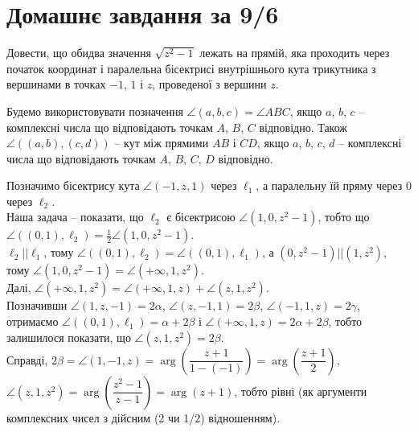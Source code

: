 \section{Домашнє завдання за 9/6}

\begin{problem}[Волковиський, 1.5]
    Довести, що обидва значення $\sqrt{z^2-1}$ лежать на прямій, яка проходить через початок координат і паралельна бісектрисі внутрішнього кута трикутника з вершинами в точках $-1$, $1$ і $z$, проведеної з вершини $z$.
\end{problem}

\begin{solution}
    Будемо використовувати позначення $\angle(a,b,c)=\angle ABC$, якщо $a$, $b$, $c$ -- комплексні числа що відповідають точкам $A$, $B$, $C$ відповідно. Також $\angle((a,b),(c,d))$ -- кут між прямими $AB$ і $CD$, якщо $a$, $b$, $c$, $d$ -- комплексні числа що відповідають точкам $A$, $B$, $C$, $D$ відповідно. 

    Позначимо бісектрису кута $\angle\left(-1, z, 1\right)$ через $\ell_1$, а паралельну їй пряму через $0$ через $\ell_2$.\\

    Наша задача -- показати, що $\ell_2$ є бісектрисою $\angle\left(1,0,z^2-1\right)$, тобто що $\angle\left(\left(0,1\right),\ell_2\right)=\frac12\angle\left(1,0,z^2-1\right)$.\\
    
    $\ell_2||\ell_1$, тому $\angle\left(\left(0,1\right),\ell_2\right) = \angle\left(\left(0,1\right), \ell_1\right)$, а $\left(0,z^2-1\right)||\left(1,z^2\right)$, тому $\angle\left(1,0,z^2-1\right)=\angle\left(+\infty,1,z^2\right)$.\\

    Далі, $\angle\left(+\infty,1,z^2\right)=\angle\left(+\infty,1,z\right)+\angle\left(z,1,z^2\right)$.\\
    
    Позначивши $\angle\left(1,z,-1\right)=2\alpha$, $\angle\left(z,-1,1\right)=2\beta$, $\angle\left(-1,1,z\right)=2\gamma$, отримаємо $\angle\left(\left(0,1\right), \ell_1\right) = \alpha + 2 \beta$ і $\angle\left(+\infty,1,z\right) = 2 \alpha + 2 \beta$, тобто залишилося показати, що $\angle\left(z,1,z^2\right) = 2\beta$.\\
    
    Справді, $2\beta=\angle\left(1,-1,z\right)=\arg\left(\dfrac{z+1}{1-(-1)}\right)=\arg\left(\dfrac{z+1}{2}\right)$, $\angle\left(z,1,z^2\right)=\arg\left(\dfrac{z^2-1}{z-1}\right)=\arg\left(z+1\right)$, тобто рівні (як аргументи комплексних чисел з дійсним (2 чи 1/2) відношенням).
\end{solution}

